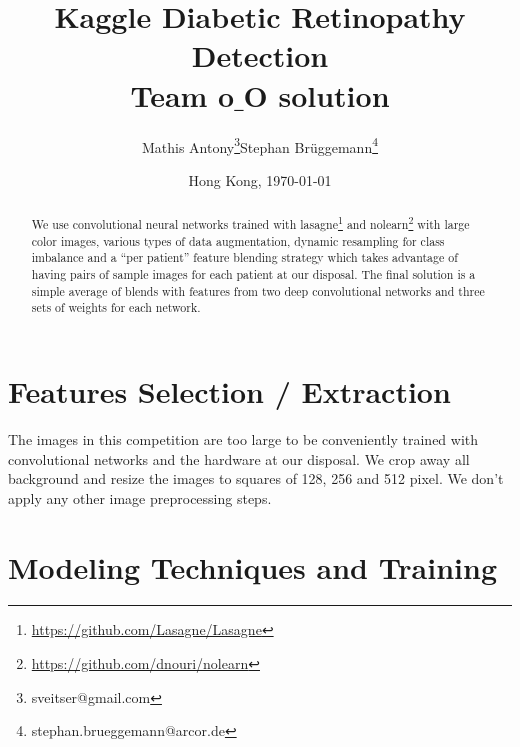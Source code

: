 \documentclass[12pt,a4paper]{scrartcl}
\title{Kaggle Diabetic Retinopathy Detection\\Team o$\_$O solution}
\author{Mathis Antony\thanks{sveitser@gmail.com}\quad Stephan Brüggemann\thanks{stephan.brueggemann@arcor.de}}
\date{Hong Kong, \today}
\begin{document}
\maketitle

\begin{abstract}
We use convolutional neural networks trained with lasagne\footnote{\url{https://github.com/Lasagne/Lasagne}} and nolearn\footnote{\url{https://github.com/dnouri/nolearn}} with large color images, various types of data augmentation, dynamic resampling for class imbalance and a ``per patient'' feature blending strategy which takes advantage of having pairs of sample images for each patient at our disposal. The final solution is a simple average of blends with features from two deep convolutional networks and three sets of weights for each network.
\end{abstract}

\section{Features Selection / Extraction}
The images in this competition are too large to be conveniently trained with convolutional networks and the hardware at our disposal. We crop away all background and resize the images to squares of 128, 256 and 512 pixel. We don't apply any other image preprocessing steps.
\section{Modeling Techniques and Training}
\end{document}
